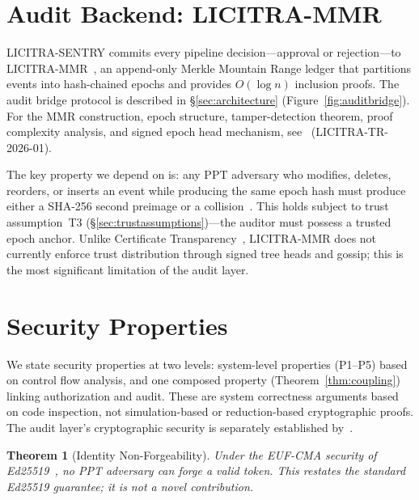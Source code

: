 \documentclass[11pt,a4paper]{article}
\newtheorem{theorem}{Theorem}[section]
\begin{document}
\section{Audit Backend: LICITRA-MMR}\label{sec:mmr}

LICITRA-SENTRY commits every pipeline decision---approval or rejection---to
LICITRA-MMR~\cite{licitrammr}, an append-only Merkle Mountain Range ledger that partitions
events into hash-chained epochs and provides $O(\log n)$ inclusion proofs. The audit bridge
protocol is described in \S\ref{sec:architecture} (Figure~\ref{fig:auditbridge}). For the MMR
construction, epoch structure, tamper-detection theorem, proof complexity analysis, and signed
epoch head mechanism, see~\cite[{\S\S3--5}]{licitrammr} (LICITRA-TR-2026-01).

The key property we depend on is: any PPT adversary who modifies, deletes, reorders, or
inserts an event while producing the same epoch hash must produce either a SHA-256 second
preimage or a collision~\cite[Theorem~1]{licitrammr}. This holds subject to trust
assumption~T3 (\S\ref{sec:trustassumptions})---the auditor must possess a trusted epoch anchor.
Unlike Certificate Transparency~\cite{ct}, LICITRA-MMR does not currently enforce trust
distribution through signed tree heads and gossip; this is the most significant limitation of
the audit layer.


\section{Security Properties}\label{sec:security}

We state security properties at two levels: system-level properties (P1--P5) based on control
flow analysis, and one composed property (Theorem~\ref{thm:coupling}) linking authorization
and audit. These are system correctness arguments based on code inspection, not
simulation-based or reduction-based cryptographic proofs. The audit layer's cryptographic
security is separately established by~\cite[Theorem~1]{licitrammr}.

\begin{theorem}[Identity Non-Forgeability]\label{thm:identity}
Under the EUF-CMA security of Ed25519~\cite{ed25519}, no PPT adversary can forge a valid
token. This restates the standard Ed25519 guarantee; it is not a novel contribution.
\end{theorem}
\end{document}
